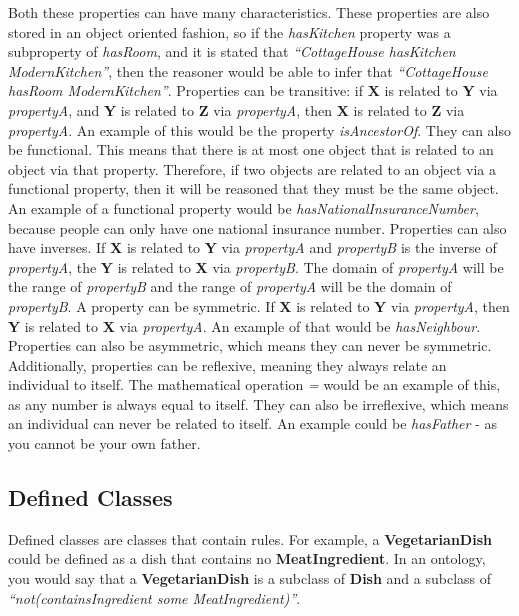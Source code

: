 Both these properties can have many characteristics. These properties are also stored in an object oriented fashion, so if the \textit{hasKitchen} property was a subproperty of \textit{hasRoom}, and it is stated that \textit{``CottageHouse hasKitchen ModernKitchen''}, then the reasoner would be able to infer that \textit{``CottageHouse hasRoom ModernKitchen''}. Properties can be transitive: if \textbf{X} is related to \textbf{Y} via \textit{propertyA}, and \textbf{Y} is related to \textbf{Z} via \textit{propertyA}, then \textbf{X} is related to \textbf{Z} via \textit{propertyA}. An example of this would be the property \textit{isAncestorOf}. They can also be functional. This means that there is at most one object that is related to an object via that property. Therefore, if two objects are related to an object via a functional property, then it will be reasoned that they must be the same object. An example of a functional property would be \textit{hasNationalInsuranceNumber}, because people can only have one national insurance number. Properties can also have inverses. If \textbf{X} is related to \textbf{Y} via \textit{propertyA} and \textit{propertyB} is the inverse of \textit{propertyA}, the \textbf{Y} is related to \textbf{X} via \textit{propertyB}. The domain of \textit{propertyA} will be the range of \textit{propertyB} and the range of \textit{propertyA} will be the domain of \textit{propertyB}. A property can be symmetric. If \textbf{X} is related to \textbf{Y} via \textit{propertyA}, then \textbf{Y} is related to \textbf{X} via \textit{propertyA}. An example of that would be \textit{hasNeighbour}. Properties can also be asymmetric, which means they can never be symmetric. Additionally, properties can be reflexive, meaning they always relate an individual to itself. The mathematical operation \textit{=} would be an example of this, as any number is always equal to itself. They can also be irreflexive, which means an individual can never be related to itself. An example could be \textit{hasFather} - as you cannot be your own father.

\subsection{Defined Classes}

Defined classes are classes that contain rules. For example, a \textbf{VegetarianDish} could be defined as a dish that contains no \textbf{MeatIngredient}. In an ontology, you would say that a \textbf{VegetarianDish} is a subclass of \textbf{Dish} and a subclass of \textit{``not(containsIngredient some MeatIngredient)''}.

